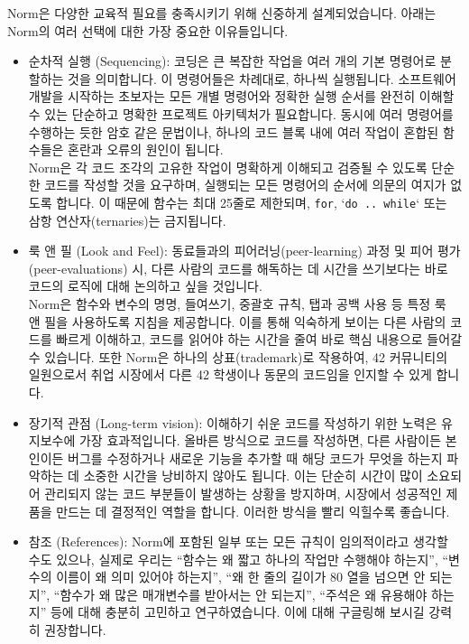 \documentclass{42-ko}
\begin{document}
    Norm은 다양한 교육적 필요를 충족시키기 위해 신중하게 설계되었습니다. 
    아래는 Norm의 여러 선택에 대한 가장 중요한 이유들입니다.
    \begin{itemize}

    \item 순차적 실행 (Sequencing): 코딩은 큰 복잡한 작업을 여러 개의 기본 
      명령어로 분할하는 것을 의미합니다. 이 명령어들은 차례대로, 하나씩 
      실행됩니다. 소프트웨어 개발을 시작하는 초보자는 모든 개별 명령어와 정확한 
      실행 순서를 완전히 이해할 수 있는 단순하고 명확한 프로젝트 아키텍처가 
      필요합니다. 동시에 여러 명령어를 수행하는 듯한 암호 같은 문법이나, 하나의 
      코드 블록 내에 여러 작업이 혼합된 함수들은 혼란과 오류의 원인이 됩니다.\\
      Norm은 각 코드 조각의 고유한 작업이 명확하게 이해되고 검증될 수 있도록 
      단순한 코드를 작성할 것을 요구하며, 실행되는 모든 명령어의 순서에 
      의문의 여지가 없도록 합니다. 이 때문에 함수는 최대 25줄로 제한되며, 
      \texttt{for}, `\texttt{do .. while}` 또는 삼항 연산자(ternaries)는 
      금지됩니다.

    \item 룩 앤 필 (Look and Feel): 동료들과의 피어러닝(peer-learning) 과정 및 
      피어 평가(peer-evaluations) 시, 다른 사람의 코드를 해독하는 데 시간을 
      쓰기보다는 바로 코드의 로직에 대해 논의하고 싶을 것입니다.\\
      Norm은 함수와 변수의 명명, 들여쓰기, 중괄호 규칙, 탭과 공백 사용 등 특정 
      룩 앤 필을 사용하도록 지침을 제공합니다. 이를 통해 익숙하게 보이는 다른 
      사람의 코드를 빠르게 이해하고, 코드를 읽어야 하는 시간을 줄여 바로 핵심 
      내용으로 들어갈 수 있습니다. 또한 Norm은 하나의 상표(trademark)로 
      작용하여, 42 커뮤니티의 일원으로서 취업 시장에서 다른 42 학생이나 동문의 
      코드임을 인지할 수 있게 합니다.

    \item 장기적 관점 (Long-term vision): 이해하기 쉬운 코드를 작성하기 위한 
      노력은 유지보수에 가장 효과적입니다. 올바른 방식으로 코드를 작성하면, 
      다른 사람이든 본인이든 버그를 수정하거나 새로운 기능을 추가할 때 해당 
      코드가 무엇을 하는지 파악하는 데 소중한 시간을 낭비하지 않아도 됩니다. 
      이는 단순히 시간이 많이 소요되어 관리되지 않는 코드 부분들이 발생하는 
      상황을 방지하며, 시장에서 성공적인 제품을 만드는 데 결정적인 역할을 
      합니다. 이러한 방식을 빨리 익힐수록 좋습니다.

    \item 참조 (References): Norm에 포함된 일부 또는 모든 규칙이 임의적이라고 
    생각할 수도 있으나, 실제로 우리는 “함수는 왜 짧고 하나의 작업만 수행해야 
    하는지”, “변수의 이름이 왜 의미 있어야 하는지”, “왜 한 줄의 길이가 80 
    열을 넘으면 안 되는지”, “함수가 왜 많은 매개변수를 받아서는 안 되는지”, 
    “주석은 왜 유용해야 하는지” 등에 대해 충분히 고민하고 연구하였습니다. 
    이에 대해 구글링해 보시길 강력히 권장합니다.

    \end{itemize}
\end{document}
